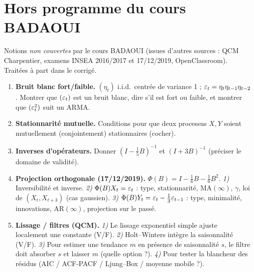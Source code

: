 \documentclass[11pt]{article}
\begin{document}
\section{Hors programme du cours BADAOUI\,\texorpdfstring{\horsprog}{*}}
\begin{tcolorbox}[colback=orangelight,colframe=orange,title={Avertissement}]
Notions \emph{non couvertes} par le cours BADAOUI (issues d'autres sources : QCM Charpentier,
examens INSEA 2016/2017 et 17/12/2019, OpenClassroom). Traitées à part dans le corrigé.
\end{tcolorbox}
\begin{enumerate}[label=\textbf{Q\,Z.\arabic*},leftmargin=*]
\item \textbf{Bruit blanc fort/faible.} $(\eta_t)$ i.i.d.\ centrée de variance 1 ;
$\varepsilon_t=\eta_t\eta_{t-1}\eta_{t-2}$. Montrer que $(\varepsilon_t)$ est un bruit blanc, dire s'il est
fort ou faible, et montrer que $(\varepsilon_t^2)$ suit un ARMA.
\item \textbf{Stationnarité mutuelle.} Conditions pour que deux processus $X,Y$ soient
mutuellement (conjointement) stationnaires (cocher).
\item \textbf{Inverses d'opérateurs.} Donner $(I-\tfrac15 B)^{-1}$ et $(I+3B)^{-1}$ (préciser
le domaine de validité).
\item \textbf{Projection orthogonale (17/12/2019).} $\Phi(B)=I-\tfrac16B-\tfrac16B^2$.
\emph{1)} Inversibilité et inverse. \emph{2)} $\Phi(B)X_t=\varepsilon_t$ : type, stationnarité,
$\mathrm{MA}(\infty)$, $\gamma$, loi de $(X_t,X_{t+3})$ (cas gaussien). \emph{3)}
$\Phi(B)Y_t=\varepsilon_t-\tfrac13\varepsilon_{t-1}$ : type, minimalité, innovations, $\mathrm{AR}(\infty)$,
projection sur le passé.
\item \textbf{Lissage / filtres (QCM).} \emph{1)} Le lissage exponentiel simple ajuste
localement une constante (V/F). \emph{2)} Holt--Winters intègre la saisonnalité (V/F).
\emph{3)} Pour estimer une tendance $m$ en présence de saisonnalité $s$, le filtre doit
absorber $s$ et laisser $m$ (quelle option ?). \emph{4)} Pour tester la blancheur des résidus
(AIC / ACF-PACF / Ljung--Box / moyenne mobile ?).
\end{enumerate}
\end{document}
